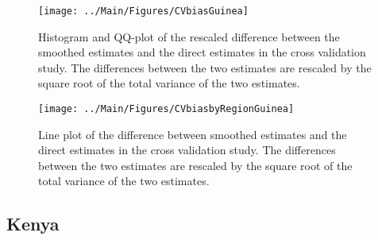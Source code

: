 \documentclass[12pt]{article}\usepackage[]{graphicx}\usepackage[]{color}
\newenvironment{knitrout}{}{} %
\begin{document}
\begin{knitrout}
\color{fgcolor}\begin{figure}[bht]

{\centering \texttt{[image: ../Main/Figures/CVbiasGuinea]} 

}

\caption[Histogram and QQ-plot of the rescaled difference between the smoothed estimates and the direct estimates in the cross validation study]{Histogram and QQ-plot of the rescaled difference between the smoothed estimates and the direct estimates in the cross validation study. The differences between the two estimates are rescaled by the square root of the total variance of the two estimates.}\label{fig:unnamed-chunk-159}
\end{figure}


\end{knitrout}

\begin{knitrout}
\color{fgcolor}\begin{figure}[bht]

{\centering \texttt{[image: ../Main/Figures/CVbiasbyRegionGuinea]} 

}

\caption[Line plot of the difference between smoothed estimates and the direct estimates in the cross validation study]{Line plot of the difference between smoothed estimates and the direct estimates in the cross validation study. The differences between the two estimates are rescaled by the square root of the total variance of the two estimates.}\label{fig:unnamed-chunk-160}
\end{figure}


\end{knitrout}


\clearpage
\subsection{Kenya}


\end{document}
